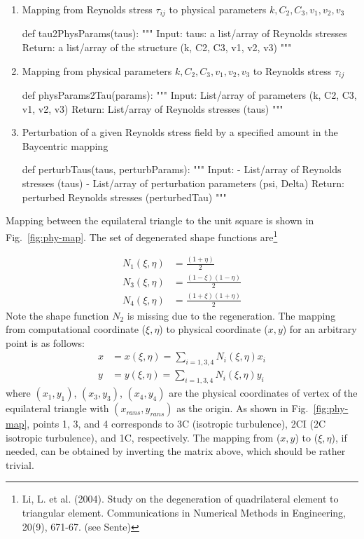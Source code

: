 \documentclass[paper = letter, fontsize = 11pt]{scrartcl} %
\begin{document}
\begin{enumerate}
\item Mapping from Reynolds stress $\tau_{ij}$ to physical parameters $k, C_2, C_3, v_1, v_2, v_3$
\begin{python}
def tau2PhysParams(taus):
    """
    Input: 
    taus: a list/array of Reynolds stresses
    Return:
    a list/array of the structure (k, C2, C3, v1, v2, v3)
    """
      \end{python}
\item Mapping from  physical parameters $k, C_2, C_3, v_1, v_2, v_3$ to Reynolds stress $\tau_{ij}$
\begin{python}
def physParams2Tau(params):
    """
    Input:
    List/array of parameters (k, C2, C3, v1, v2, v3)
    Return: 
    List/array of  Reynolds stresses (taus)
    """
  \end{python}

\item Perturbation of a given Reynolds stress field by a specified amount in the Baycentric mapping
\begin{python}
def perturbTaus(taus, perturbParams):
    """
    Input:
    -  List/array of Reynolds stresses (taus)
    -  List/array of perturbation parameters (psi, Delta)
    Return:
    perturbed Reynolds stresses (perturbedTau)
    """
\end{python}
\end{enumerate}

Mapping between the equilateral triangle to the unit square is shown in Fig.~\ref{fig:phy-map}.  The set of degenerated 
shape functions are\footnote{Li, L. et al. (2004). Study on the degeneration of quadrilateral element to triangular element. Communications in Numerical Methods in Engineering, 20(9), 671-67. (see Sente)}

\begin{align}
  \label{eq:shapefun}
  N_1(\xi, \eta) & = \frac{(1 + \eta)}{2} \\
  N_3(\xi, \eta) & = \frac{(1 - \xi) (1 - \eta)}{2} \\
  N_4(\xi, \eta) & = \frac{(1 + \xi) (1 + \eta)}{2}
\end{align}
Note the shape function $N_2$ is missing due to the regeneration.  The mapping from computational
coordinate ($\xi, \eta$) to physical coordinate ($x, y$) for an arbitrary point is as follows:
\begin{align}
  x & = x(\xi, \eta) = \sum_{i=1, 3, 4} N_i (\xi, \eta) x_i \\
  y & = y(\xi, \eta) = \sum_{i=1, 3, 4} N_i (\xi, \eta) y_i
\end{align}
where $(x_1, y_1)$, $(x_3, y_3)$, $(x_4, y_4)$ are the physical coordinates of vertex of the
equilateral triangle with $(x_{rans}, y_{rans})$ as the origin. As shown in Fig.~\ref{fig:phy-map},
points 1, 3, and 4 corresponds to 3C (isotropic turbulence), 2CI (2C isotropic turbulence), and 1C,
respectively. The mapping from ($x, y$) to ($\xi, \eta$), if needed, can be obtained by inverting
the matrix above, which should be rather trivial.
\end{document}
